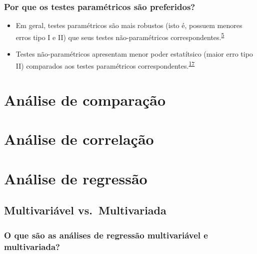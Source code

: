 \documentclass[
]{book}
\begin{document}
\hypertarget{por-que-os-testes-paramuxe9tricos-suxe3o-preferidos}{%
\subsection{Por que os testes paramétricos são preferidos?}\label{por-que-os-testes-paramuxe9tricos-suxe3o-preferidos}}

\begin{itemize}
\item
  Em geral, testes paramétricos são mais robustos (isto é, possuem menores erros tipo I e II) que seus testes não-paramétricos correspondentes.\textsuperscript{\protect\hyperlink{ref-vetter2017}{5}}
\item
  Testes não-paramétricos apresentam menor poder estatítsico (maior erro tipo II) comparados aos testes paramétricos correspondentes.\textsuperscript{\protect\hyperlink{ref-Ali2016}{17}}
\end{itemize}

\hypertarget{analise-comparacao}{%
\chapter{\texorpdfstring{\textbf{Análise de comparação}}{Análise de comparação}}\label{analise-comparacao}}

\hypertarget{analise-correlacao}{%
\chapter{\texorpdfstring{\textbf{Análise de correlação}}{Análise de correlação}}\label{analise-correlacao}}

\hypertarget{analise-regresaao}{%
\chapter{\texorpdfstring{\textbf{Análise de regressão}}{Análise de regressão}}\label{analise-regresaao}}

\hypertarget{multivariavel-multivariada}{%
\section{Multivariável vs.~Multivariada}\label{multivariavel-multivariada}}

\hypertarget{o-que-suxe3o-as-anuxe1lises-de-regressuxe3o-multivariuxe1vel-e-multivariada}{%
\subsection{O que são as análises de regressão multivariável e multivariada?}\label{o-que-suxe3o-as-anuxe1lises-de-regressuxe3o-multivariuxe1vel-e-multivariada}}
\end{document}
